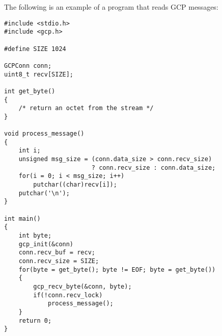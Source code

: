\documentclass{article}
\begin{document}
The following is an example of a program that reads GCP messages:
\begin{verbatim}
#include <stdio.h>
#include <gcp.h>

#define SIZE 1024

GCPConn conn;
uint8_t recv[SIZE];

int get_byte()
{
    /* return an octet from the stream */
}

void process_message()
{
    int i;
    unsigned msg_size = (conn.data_size > conn.recv_size)
                        ? conn.recv_size : conn.data_size;
    for(i = 0; i < msg_size; i++)
        putchar((char)recv[i]);
    putchar('\n');    
}

int main()
{
    int byte;
    gcp_init(&conn)
    conn.recv_buf = recv;
    conn.recv_size = SIZE;
    for(byte = get_byte(); byte != EOF; byte = get_byte())
    {
        gcp_recv_byte(&conn, byte);
        if(!conn.recv_lock)
            process_message();
    }
    return 0;
}
\end{verbatim}
\end{document}
